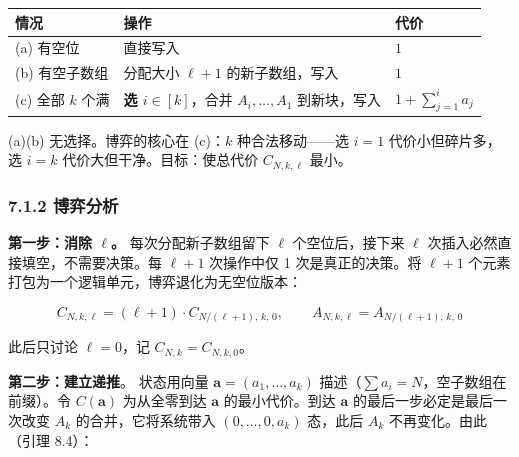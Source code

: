 \documentclass[
  UTF8,
  a4paper,
  12pt]{ctexart}
\newcounter{none} %
\begin{document}
{\def\LTcaptype{none} %
\begin{longtable}[]{@{}
  >{\raggedright\arraybackslash}p{}
  >{\raggedright\arraybackslash}p{}
  >{\raggedright\arraybackslash}p{}@{}}
\toprule\noalign{}
\begin{minipage}[b]{\linewidth}\raggedright
情况
\end{minipage} & \begin{minipage}[b]{\linewidth}\raggedright
操作
\end{minipage} & \begin{minipage}[b]{\linewidth}\raggedright
代价
\end{minipage} \\
\midrule\noalign{}
\endhead
\bottomrule\noalign{}
\endlastfoot
(a) 有空位 & 直接写入 & \(1\) \\
(b) 有空子数组 & 分配大小 \(\ell+1\) 的新子数组，写入 & \(1\) \\
(c) 全部 \(k\) 个满 & \textbf{选 \(i \in [k]\)}，合并
\(A_i, \dots, A_1\) 到新块，写入 & \(1 + \sum_{j=1}^i a_j\) \\
\end{longtable}
}

(a)(b) 无选择。博弈的核心在 (c)：\(k\) 种合法移动------选 \(i=1\)
代价小但碎片多，选 \(i=k\) 代价大但干净。目标：使总代价 \(C_{N,k,\ell}\)
最小。

\subsubsection{7.1.2 博弈分析}\label{ux535aux5f08ux5206ux6790}

\textbf{第一步：消除 \(\ell\)。} 每次分配新子数组留下 \(\ell\)
个空位后，接下来 \(\ell\) 次插入必然直接填空，不需要决策。每 \(\ell+1\)
次操作中仅 1 次是真正的决策。将 \(\ell+1\)
个元素打包为一个逻辑单元，博弈退化为无空位版本：

\[C_{N,k,\ell} = (\ell+1) \cdot C_{N/(\ell+1),\, k,\, 0}, \qquad A_{N,k,\ell} = A_{N/(\ell+1),\, k,\, 0}\]

此后只讨论 \(\ell = 0\)，记 \(C_{N,k} = C_{N,k,0}\)。

\textbf{第二步：建立递推}。 状态用向量
\(\mathbf{a} = (a_1, \dots, a_k)\)
描述（\(\sum a_i = N\)，空子数组在前缀）。令 \(C(\mathbf{a})\)
为从全零到达 \(\mathbf{a}\) 的最小代价。到达 \(\mathbf{a}\)
的最后一步必定是最后一次改变 \(A_k\) 的合并，它将系统带入
\((0, \dots, 0, a_k)\) 态，此后 \(A_k\) 不再变化。由此（引理 8.4）：
\end{document}
